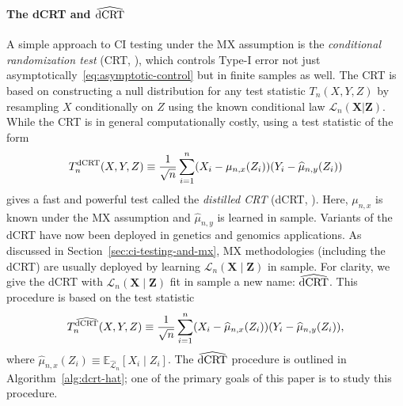 \documentclass[aos]{imsart}
\theoremstyle{plain}
\theoremstyle{remark}
\newcommand{\E}{\mathbb E}								%
\newcommand{\prx}{\bm X}								%
\newcommand{\srx}{X}									%
\newcommand{\prz}{\bm Z}								%
\newcommand{\srz}{Z}									%
\newcommand{\sry}{Y}									%
\newcommand{\law}{\mathcal L}							%
\newcommand{\lawhat}{\widehat{\mathcal L}}				%
\newcommand{\dCRT}{\textnormal{dCRT}} 					%
\newcommand{\dCRThat}{\widehat{\textnormal{dCRT}}}		%
\begin{document}
\paragraph*{The dCRT and $\dCRThat$}

A simple approach to CI testing under the MX assumption is the \textit{conditional randomization test} (CRT, \cite{CetL16}), which controls Type-I error not just asymptotically~\eqref{eq:asymptotic-control} but in finite samples as well. The CRT is based on constructing a null distribution for any test statistic $T_n(\srx, \sry, \srz)$ by resampling $\srx$ conditionally on $\srz$ using the known conditional law $\law_n(\prx|\prz)$. While the CRT is in general computationally costly, using a test statistic of the form
\begin{equation*}
    T_n^{\dCRT}(\srx, \sry, \srz) \equiv \frac{1}{\sqrt{n}}\sum_{i = 1}^n (\srx_i - \mu_{n,x}(\srz_i))(\sry_i - \widehat \mu_{n,y}(\srz_i))
\end{equation*}
gives a fast and powerful test called the \textit{distilled CRT} (dCRT, \cite{Liu2022a}). Here, $\mu_{n,x}$ is known under the MX assumption and $\widehat \mu_{n,y}$ is learned in sample. Variants of the dCRT have now been deployed in genetics \citep{Bates2020} and genomics \citep{Katsevich2020c} applications. As discussed in Section~\ref{sec:ci-testing-and-mx}, MX methodologies (including the dCRT) are usually deployed by learning $\law_n(\prx \mid \prz)$ in sample. For clarity, we give the dCRT with $\law_n(\prx \mid \prz)$ fit in sample a new name: $\dCRThat$. This procedure is based on the test statistic
\begin{equation}
    T_n^{\dCRThat}(\srx, \sry, \srz) \equiv \frac{1}{\sqrt{n}}\sum_{i = 1}^n (\srx_i - \widehat \mu_{n,x}(\srz_i))(\sry_i - \widehat \mu_{n,y}(\srz_i)),
    \label{eq:dcrt-hat-stat}
\end{equation}
where $\widehat \mu_{n,x}(\srz_i) \equiv \E_{\lawhat_n}[\srx_i \mid \srz_i]$. The $\dCRThat$ procedure is outlined in Algorithm~\ref{alg:dcrt-hat}; one of the primary goals of this paper is to study this procedure.
\end{document}
